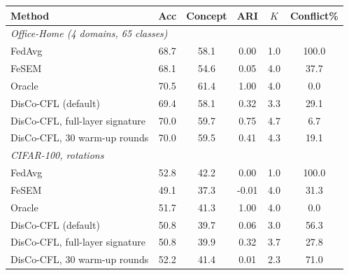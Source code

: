 \scriptsize
\begin{tabular}{lccccc}
\toprule
Method & Acc & Concept & ARI & $K$ & Conflict\% \\
\midrule
\multicolumn{6}{l}{\textit{Office-Home (4 domains, 65 classes)}}\\
FedAvg & 68.7 & 58.1 & 0.00 & 1.0 & 100.0 \\
FeSEM & 68.1 & 54.6 & 0.05 & 4.0 & 37.7 \\
Oracle & 70.5 & 61.4 & 1.00 & 4.0 & 0.0 \\
DisCo-CFL (default) & 69.4 & 58.1 & 0.32 & 3.3 & 29.1 \\
DisCo-CFL, full-layer signature & 70.0 & 59.7 & 0.75 & 4.7 & 6.7 \\
DisCo-CFL, 30 warm-up rounds & 70.0 & 59.5 & 0.41 & 4.3 & 19.1 \\
\midrule
\multicolumn{6}{l}{\textit{CIFAR-100, rotations}}\\
FedAvg & 52.8 & 42.2 & 0.00 & 1.0 & 100.0 \\
FeSEM & 49.1 & 37.3 & -0.01 & 4.0 & 31.3 \\
Oracle & 51.7 & 41.3 & 1.00 & 4.0 & 0.0 \\
DisCo-CFL (default) & 50.8 & 39.7 & 0.06 & 3.0 & 56.3 \\
DisCo-CFL, full-layer signature & 50.8 & 39.9 & 0.32 & 3.7 & 27.8 \\
DisCo-CFL, 30 warm-up rounds & 52.2 & 41.4 & 0.01 & 2.3 & 71.0 \\
\bottomrule
\end{tabular}
